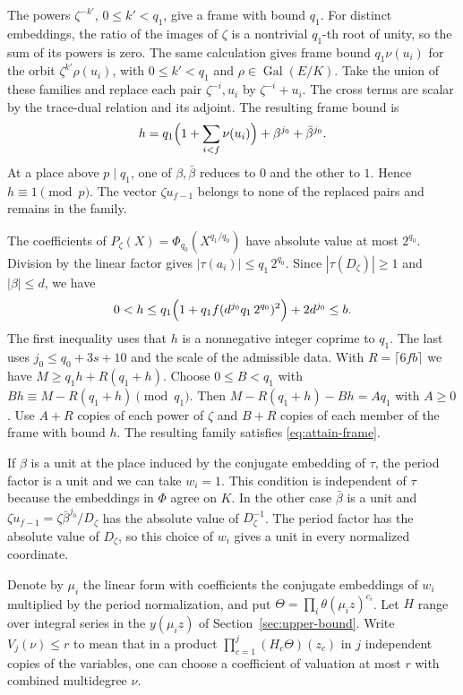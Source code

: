 The powers \(\zeta^{-k'}\), \(0\le k'<q_1\), give a frame with bound \(q_1\).
For distinct embeddings, the ratio of the images of \(\zeta\) is a
nontrivial \(q_1\)-th root of unity, so the sum of its powers is zero.
The same calculation gives frame bound \(q_1\nu(u_i)\) for the orbit
\(\zeta^{k'}\rho(u_i)\), with \(0\le k'<q_1\) and
\(\rho\in\operatorname{Gal}(E/K)\).
Take the union of these families and replace each pair
\(\zeta^{-i},u_i\) by \(\zeta^{-i}+u_i\).
The cross terms are scalar by the trace-dual relation and its adjoint.
The resulting frame bound is
\[
 h=q_1\Bigl(1+\sum_{i<f}\nu(u_i)\Bigr)+\beta^{j_0}+\bar\beta^{j_0}.
\]
At a place above \(p\mid q_1\), one of \(\beta,\bar\beta\) reduces to \(0\)
and the other to \(1\). Hence \(h\equiv1\pmod p\).
The vector \(\zeta u_{f-1}\) belongs to none of the replaced pairs and
remains in the family.

The coefficients of \(P_\zeta(X)=\Phi_{q_0}(X^{q_1/q_0})\) have absolute value
at most \(2^{q_0}\). Division by the linear factor gives
\(|\tau(a_i)|\le q_1\,2^{q_0}\).
Since \(|\tau(D_\zeta)|\ge1\) and \(|\beta|\le d\), we have
\[
 0<h\le q_1\Bigl(1+q_1 f(d^{j_0}q_1\,2^{q_0})^2\Bigr)+2d^{j_0}\le b .
\]
The first inequality uses that \(h\) is a nonnegative integer coprime to \(q_1\).
The last uses \(j_0\le q_0+3s+10\) and the scale of the admissible data.
With \(R=\lceil6fb\rceil\) we have \(M\ge q_1h+R(q_1+h)\).
Choose \(0\le B<q_1\) with \(Bh\equiv M-R(q_1+h)\pmod{q_1}\).
Then \(M-R(q_1+h)-Bh=Aq_1\) with \(A\ge0\).
Use \(A+R\) copies of each power of \(\zeta\) and \(B+R\) copies of each
member of the frame with bound \(h\). The resulting family satisfies
\eqref{eq:attain-frame}.

If \(\beta\) is a unit at the place induced by the conjugate embedding
of \(\tau\), the period factor is a unit and we can take \(w_i=1\).
This condition is independent of \(\tau\) because the embeddings in
\(\Phi\) agree on \(K\). In the other case \(\bar\beta\) is a unit and
\(\zeta u_{f-1}=\zeta\bar\beta^{j_0}/D_\zeta\) has the absolute value of
\(D_\zeta^{-1}\). The period factor has the absolute value of \(D_\zeta\),
so this choice of \(w_i\) gives a unit in every normalized coordinate.

Denote by \(\mu_i\) the linear form with coefficients the conjugate embeddings
of \(w_i\) multiplied by the period normalization, and put
\(\Theta=\prod_i\theta(\mu_i z)^{c_i}\). Let \(H\) range over integral series in
the \(y(\mu_i z)\) of Section~\ref{sec:upper-bound}.
Write \(V_j(\nu)\le r\) to mean that in a product
\(\prod_{c=1}^j(H_c\Theta)(z_c)\) in \(j\) independent copies of the variables,
one can choose a coefficient of valuation at most \(r\) with combined multidegree \(\nu\).

